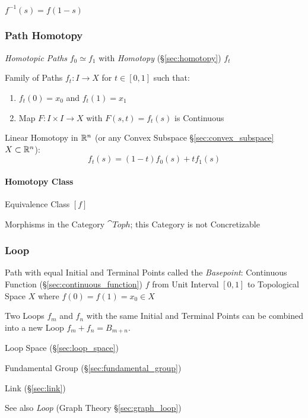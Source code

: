 $f^{-1}(s) = f(1-s)$



\subsubsection{Path Homotopy}\label{sec:path_homotopy}

\emph{Homotopic Paths} $f_0 \simeq f_1$ with \emph{Homotopy}
(\S\ref{sec:homotopy}) $f_t$

Family of Paths $f_t : I \rightarrow X$ for $t \in [0,1]$ such that:
\begin{enumerate}
  \item $f_t(0) = x_0$ and $f_t(1) = x_1$
  \item Map $F : I \times I \rightarrow X$ with $F(s,t) = f_t(s)$ is
    Continuous
\end{enumerate}

Linear Homotopy in $\mathbb{R}^n$ (or any Convex Subspace
\S\ref{sec:convex_subspace} $X \subset \mathbb{R}^n$):
\[
  f_t(s) = (1 - t) f_0(s) + t f_1(s)
\]



\paragraph{Homotopy Class}\label{sec:homotopy_class}\hfill

Equivalence Class $[f]$

Morphisms in the Category $\cat{Toph}$; this Category is not
Concretizable



\subsubsection{Loop}\label{sec:loop}

Path with equal Initial and Terminal Points called the
\emph{Basepoint}: Continuous Function
(\S\ref{sec:continuous_function}) $f$ from Unit Interval $[0,1]$ to
Topological Space $X$ where $f(0) = f(1) = x_0 \in X$

Two Loops $f_m$ and $f_n$ with the same Initial and Terminal Points
can be combined into a new Loop $f_m + f_n = B_{m+n}$.
\cite{hatcher02}

Loop Space (\S\ref{sec:loop_space})

Fundamental Group (\S\ref{sec:fundamental_group})

Link (\S\ref{sec:link})

\fist See also \emph{Loop} (Graph Theory \S\ref{sec:graph_loop})



